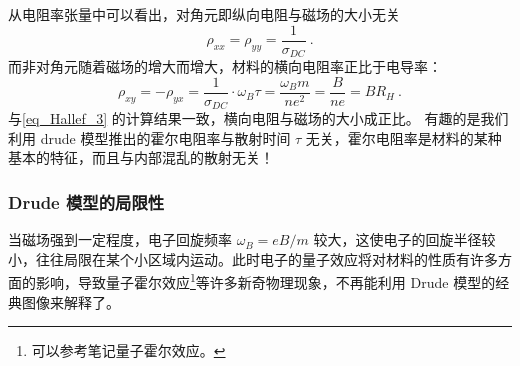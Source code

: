 从电阻率张量中可以看出，对角元即纵向电阻与磁场的大小无关
\begin{equation}
\rho_{xx}=\rho_{yy}=\frac{1}{\sigma_{DC}} ~.
\end{equation}
而非对角元随着磁场的增大而增大，材料的横向电阻率正比于电导率：
\begin{equation}
\rho_{xy}=-\rho_{yx} = \frac{1}{\sigma_{DC}}\cdot \omega_B\tau=\frac{\omega_B m}{ne^2}=\frac{B}{ne}=BR_H~.
\end{equation}
与\autoref{eq_Hallef_3} 的计算结果一致，横向电阻与磁场的大小成正比。
有趣的是我们利用 drude 模型推出的霍尔电阻率与散射时间 $\tau$ 无关，霍尔电阻率是材料的某种基本的特征，而且与内部混乱的散射无关！

\subsubsection{Drude 模型的局限性}
当磁场强到一定程度，电子回旋频率 $\omega_B=eB/m$ 较大，这使电子的回旋半径较小，往往局限在某个小区域内运动。此时电子的量子效应将对材料的性质有许多方面的影响，导致量子霍尔效应\footnote{可以参考笔记量子霍尔效应。}等许多新奇物理现象，不再能利用 Drude 模型的经典图像来解释了。